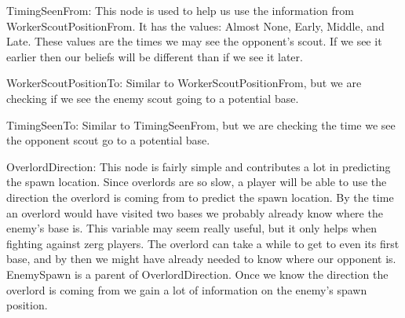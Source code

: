TimingSeenFrom: This node is used to help us use the information from WorkerScoutPositionFrom. It has the values: Almost None, Early, Middle, and Late. These values are the times we may see the opponent's scout. If we see it earlier then our beliefs will be different than if we see it later.

WorkerScoutPositionTo: Similar to WorkerScoutPositionFrom, but we are checking if we see the enemy scout going to a potential base.

TimingSeenTo: Similar to TimingSeenFrom, but we are checking the time we see the opponent scout go to a potential base.

OverlordDirection: This node is fairly simple and contributes a lot in predicting the spawn location. Since overlords are so slow, a player will be able to use the direction the overlord is coming from to predict the spawn location. By the time an overlord would have visited two bases we probably already know where the enemy's base is. This variable may seem really useful, but it only helps when fighting against zerg players. The overlord can take a while to get to even its first base, and by then we might have already needed to know where our opponent is. EnemySpawn is a parent of OverlordDirection. Once we know the direction the overlord is coming from we gain a lot of information on the enemy's spawn position.


